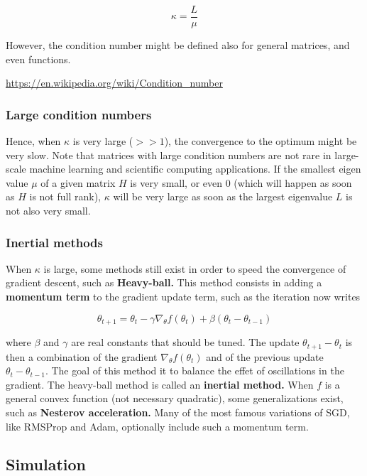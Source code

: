 \documentclass[
10pt, %
a4paper, %
oneside, %
headinclude,footinclude, %
BCOR5mm, %
]{scrartcl}
\begin{document}
\begin{equation}
    \kappa = \frac{L}{\mu}
\end{equation}

However, the condition number might be defined also for general matrices, and even functions.

\url{https://en.wikipedia.org/wiki/Condition_number}

\subsubsection{Large condition numbers}

Hence, when $\kappa$ is very large ($>>1$), the convergence to the optimum might be very slow. Note that matrices with large condition numbers are not rare in large-scale machine learning and scientific computing applications. If the smallest eigen value $\mu$ of a given matrix $H$ is very small, or even $0$ (which will happen as soon as $H$ is not full rank), $\kappa$ will be very large as soon as the largest eigenvalue $L$ is not also very small.

\subsubsection{Inertial methods}

When $\kappa$ is large, some methods still exist in order to speed the convergence of gradient descent, such as \textbf{{Heavy-ball.}}  This method consists in adding a \textbf{{momentum term}} to the gradient update term, such as the iteration now writes

\begin{equation}
    \theta_{t+1} = \theta_{t}- \gamma \nabla_{ \theta}f(\theta_{t})+ \beta( \theta_{t}- \theta_{t-1})  
\end{equation}

where $\beta$ and $\gamma$ are real constants that should be tuned. The update $ \theta_{t+1}- \theta_{t}$ is then a combination of the gradient $ \nabla_{ \theta}f(\theta_{t})$ and of the previous update $ \theta_{t}-  \theta_{t-1}$. The goal of this method it to balance the effet of oscillations in the gradient. The heavy-ball method is called an \textbf{{inertial method.}} When $f$ is a general convex function (not necessary quadratic), some generalizations exist, such as \textbf{{Nesterov acceleration.}}  Many of the most famous variations of SGD, like RMSProp and Adam, optionally include such a momentum term.


\subsection{Simulation}
\end{document}
